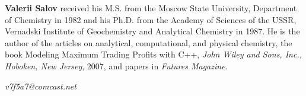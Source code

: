 \documentclass{article}
\begin{document}
\bigskip

\noindent\textbf{Valerii Salov} received his M.S. from the Moscow State University, Department of Chemistry in 1982 and his Ph.D. from the Academy of Sciences of the USSR, Vernadski Institute of Geochemistry and Analytical Chemistry in 1987.  He is the author of the articles on analytical, computational, and physical chemistry, the book Modeling Maximum Trading Profits with C++, \textit{John Wiley and Sons, Inc., Hoboken, New Jersey}, 2007, and papers in \textit{Futures Magazine}.

\noindent\textit{v7f5a7@comcast.net}
\end{document}

